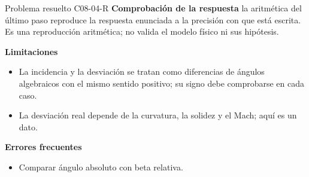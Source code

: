 \documentclass[10pt,openany]{book}
\begin{document}
\begin{studiumworked}{Problema resuelto C08-04-R}
\noindent\textbf{Comprobación de la respuesta} la aritmética del último paso reproduce la respuesta enunciada a la precisión con que está escrita. Es una reproducción aritmética; no valida el modelo físico ni sus hipótesis.

\noindent\textbf{Limitaciones}
\begin{itemize}
\item La incidencia y la desviación se tratan como diferencias de ángulos algebraicos con el mismo sentido positivo; su signo debe comprobarse en cada caso.
\item La desviación real depende de la curvatura, la solidez y el Mach; aquí es un dato.
\end{itemize}

\noindent\textbf{Errores frecuentes}
\begin{itemize}
\item Comparar ángulo absoluto con beta relativa.
\end{itemize}
\end{studiumworked}
\end{document}
